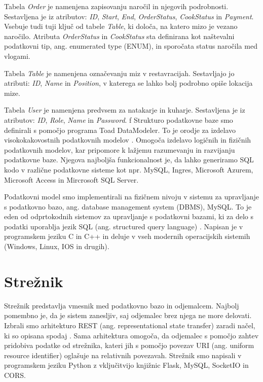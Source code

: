 \documentclass[a4paper, 12pt]{book}
\begin{document}
Tabela \textit{Order} je namenjena zapisovanju naročil in njegovih podrobnosti. Sestavljena je iz atributov: \textit{ID}, \textit{Start}, \textit{End}, \textit{OrderStatus}, \textit{CookStatus} in \textit{Payment}. Vsebuje tudi tuji ključ od tabele \textit{Table}, ki določa, na katero mizo je vezano naročilo. Atributa \textit{OrderStatus} in \textit{CookStatus} sta definirana kot naštevalni podatkovni tip, ang. enumerated type (ENUM), in sporočata status naročila med vlogami.

Tabela \textit{Table} je namenjena označevanju miz v restavracijah. Sestavljajo jo atributi: \textit{ID}, \textit{Name} in \textit{Position}, v katerega se lahko bolj podrobno opiše lokacija mize.

Tabela \textit{User} je namenjena predvsem za natakarje in kuharje. Sestavljena je iz atributov: \textit{ID}, \textit{Role}, \textit{Name} in \textit{Password}. 
f
Strukturo podatkovne baze smo definirali s pomočjo programa Toad DataModeler. To je orodje za izdelavo visokokakovostnih podatkovnih modelov \cite{Toad_Data_Modeler}. Omogoča izdelavo logičnih in fizičnih podatkovnih modelov, kar pripomore k lažjemu razumevanju in razvijanju podatkovne baze. Njegova najboljša funkcionalnost je, da lahko generiramo SQL kodo v različne podatkovne sisteme kot npr. MySQL, Ingres, Microsoft Azurem, Microsoft Access in Mircrosoft SQL Server.

Podatkovni model smo implementirali na fizičnem nivoju v sistemu za upravljanje s podatkovno bazo, ang. database management system (DBMS), MySQL. To je eden od odprtokodnih sistemov za upravljanje s podatkovni bazami, ki za delo s podatki uporablja jezik SQL (ang. structured query language) \cite{MySQL}. Napisan je v programskem jeziku C in C++ in deluje v vseh modernih operacijskih sistemih (Windows, Linux, IOS in drugih).


\section{Strežnik}
Strežnik predstavlja vmesnik med podatkovno bazo in odjemalcem. Najbolj pomembno je, da je sistem zanesljiv, saj odjemalec brez njega ne more delovati. Izbrali smo arhitekturo REST (ang. representational state transfer) zaradi načel, ki so opisana spodaj \cite{RESTAPI}. Sama arhitektura omogoča, da odjemalec s pomočjo zahtev pridobiva podatke od strežnika, kateri jih s pomočjo povezav URI (ang. uniform resource identifier) oglašuje na relativnih povezavah. Strežnik smo napisali v programskem jeziku Python z vključitvijo knjižnic Flask, MySQL, SocketIO in CORS.
\end{document}
